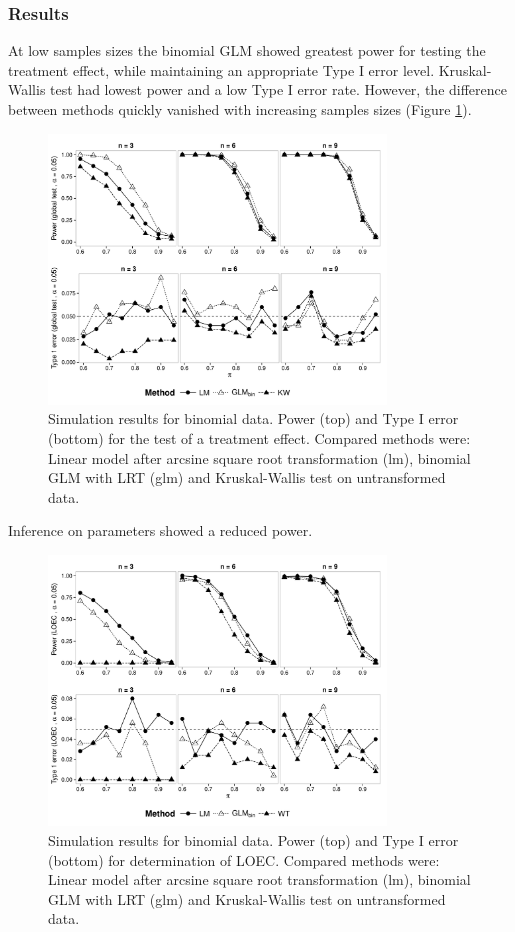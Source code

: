 \documentclass{scrartcl}
\begin{document}
\subsubsection{Results}
At low samples sizes the binomial GLM showed greatest power for testing the treatment effect, while maintaining an appropriate Type I error level.
Kruskal-Wallis test had lowest power and a low Type I error rate.
However, the difference between methods quickly vanished with increasing samples sizes (Figure \ref{fig:p_glob_p}).

\begin{figure}
  \centering
  \includegraphics[width = 0.8\textwidth]{p_glob_p.pdf}
  \caption{Simulation results for binomial data. Power (top) and Type I error (bottom) for the test of a treatment effect. Compared methods were: Linear model after arcsine square root transformation (lm), binomial GLM with LRT (glm) and Kruskal-Wallis test on untransformed data.}
  \label{fig:p_glob_p}
\end{figure}

Inference on parameters showed a reduced power.

\begin{figure}
  \centering
  \includegraphics[width = 0.8\textwidth]{p_loec_p.pdf}
  \caption{Simulation results for binomial data. Power (top) and Type I error (bottom) for determination of LOEC. Compared methods were: Linear model after arcsine square root transformation (lm), binomial GLM with LRT (glm) and Kruskal-Wallis test on untransformed data.}
  \label{fig:p_loec_p}
\end{figure}
\end{document}
